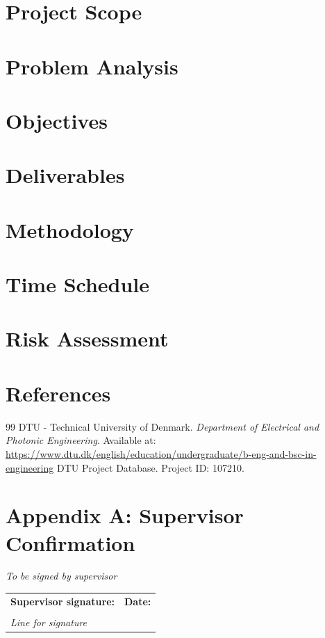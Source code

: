 \documentclass[a4paper,12pt]{article}
\newcommand{\projectID}{107210}
\begin{document}
\section{Project Scope}


\section{Problem Analysis}


\section{Objectives}


\section{Deliverables}


\section{Methodology}


\section{Time Schedule}


\section{Risk Assessment}


\newpage
\section{References}
\begin{thebibliography}{99}
     DTU - Technical University of Denmark. \textit{Department of Electrical and Photonic Engineering}. Available at: \url{https://www.dtu.dk/english/education/undergraduate/b-eng-and-bsc-in-engineering}
     DTU Project Database. Project ID: \projectID.
\end{thebibliography}

\newpage
\appendix
\section{Appendix A: Supervisor Confirmation}
\textit{To be signed by supervisor}

\vspace{2cm}
\noindent
\begin{tabular}{p{7cm}p{7cm}}
    \textbf{Supervisor signature:} & \textbf{Date:} \\
    & \\
    \hline
    \textit{Line for signature} & \\
\end{tabular}
\end{document}
